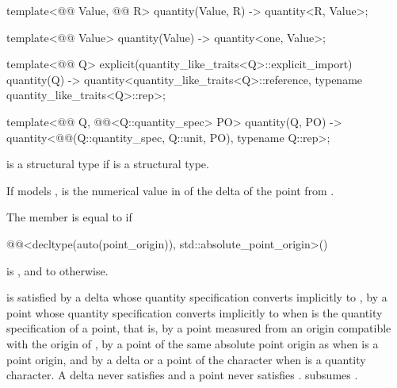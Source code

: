 \begin{codeblock}
{template<@@ Value, @@ R>
quantity(Value, R) -> quantity<R{}, Value>;

template<@@ Value>
quantity(Value) -> quantity<one, Value>;

template<@@ Q>
explicit(quantity_like_traits<Q>::explicit_import) quantity(Q)
  -> quantity<quantity_like_traits<Q>::reference, typename quantity_like_traits<Q>::rep>;

template<@@ Q, @@<Q::quantity_spec> PO>
quantity(Q, PO) -> quantity<@@(Q::quantity_spec, Q::unit, PO{}), typename Q::rep>;

}
\end{codeblock}

\pnum
{} is a structural type
if  is a structural type.

\pnum
If  models ,
 is the numerical value in 
of the delta of the point from .

\pnum
The member  is equal to  if
\begin{codeblock}
@@<decltype(auto(point_origin)), std::absolute_point_origin>()
\end{codeblock}
is , and
to  otherwise.

\pnum
\begin{note}
 is satisfied
by a delta whose quantity specification converts implicitly to ,
by a point whose quantity specification converts implicitly to 
when  is the quantity specification of a point,
that is, by a point measured from an origin compatible with the origin of ,
by a point of the same absolute point origin as 
when  is a point origin, and
by a delta or a point of the character 
when  is a quantity character.
A delta never satisfies 
and a point never satisfies .
 subsumes
.
\end{note}

